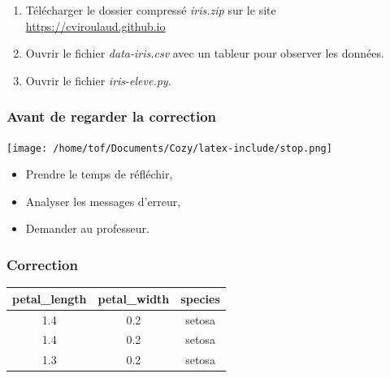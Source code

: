 \documentclass[svgnames,11pt]{beamer}
\begin{document}
\begin{frame}
    \frametitle{}

    \begin{activite}
        \begin{enumerate}
            \item Télécharger le dossier compressé \emph{iris.zip} sur le site \url{https://cviroulaud.github.io}
            \item Ouvrir le fichier \emph{data-iris.csv} avec un tableur pour observer les données.
            \item Ouvrir le fichier \emph{iris-eleve.py}.
            
            
        \end{enumerate}
        \end{activite}

\end{frame}
\begin{frame}
    \frametitle{Avant de regarder la correction}
\begin{center}
    \centering
    \texttt{[image: /home/tof/Documents/Cozy/latex-include/stop.png]}
    \end{center}
{\Large
    \begin{itemize}
        \item Prendre le temps de réfléchir,
        \item Analyser les messages d'erreur,
        \item Demander au professeur.
    \end{itemize}
}
\end{frame}
\begin{frame}
    \frametitle{Correction}

    \begin{center}
        \begin{tabular}[]{|*{3}{c|}}
            \hline
            petal\_length&petal\_width&species\\
            \hline
            1.4&0.2&setosa\\
            \hline
            1.4&0.2&setosa\\
            \hline
            1.3&0.2&setosa\\
\hline
        \end{tabular}
    \end{center}
\end{frame}
\end{document}
